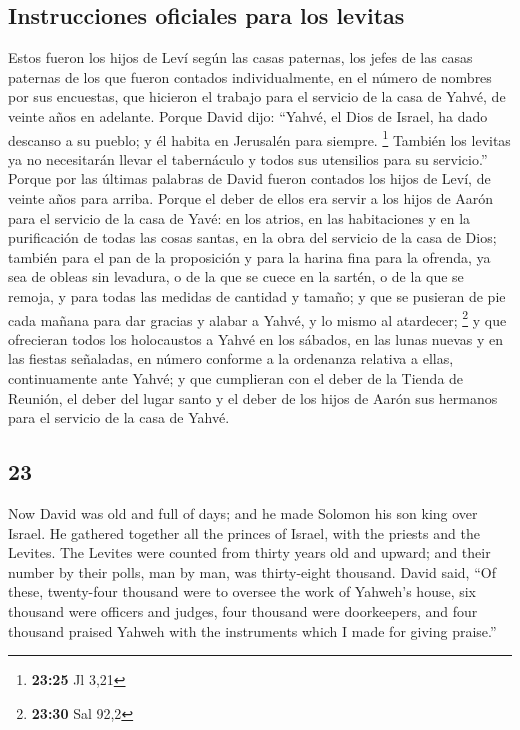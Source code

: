 \begin{paracol}{2}
\hypertarget{instrucciones-oficiales-para-los-levitas}{%
\subsection{Instrucciones oficiales para los
levitas}\label{instrucciones-oficiales-para-los-levitas}}

 Estos fueron los hijos de Leví según las casas paternas,
los jefes de las casas paternas de los que fueron contados
individualmente, en el número de nombres por sus encuestas, que hicieron
el trabajo para el servicio de la casa de Yahvé, de veinte años en
adelante.  Porque David dijo: ``Yahvé, el Dios de Israel,
ha dado descanso a su pueblo; y él habita en Jerusalén para siempre.
\footnote{\textbf{23:25} Jl 3,21}  También los levitas ya
no necesitarán llevar el tabernáculo y todos sus utensilios para su
servicio.''  Porque por las últimas palabras de David
fueron contados los hijos de Leví, de veinte años para arriba.
 Porque el deber de ellos era servir a los hijos de Aarón
para el servicio de la casa de Yavé: en los atrios, en las habitaciones
y en la purificación de todas las cosas santas, en la obra del servicio
de la casa de Dios;  también para el pan de la
proposición y para la harina fina para la ofrenda, ya sea de obleas sin
levadura, o de la que se cuece en la sartén, o de la que se remoja, y
para todas las medidas de cantidad y tamaño;  y que se
pusieran de pie cada mañana para dar gracias y alabar a Yahvé, y lo
mismo al atardecer; \footnote{\textbf{23:30} Sal 92,2}  y
que ofrecieran todos los holocaustos a Yahvé en los sábados, en las
lunas nuevas y en las fiestas señaladas, en número conforme a la
ordenanza relativa a ellas, continuamente ante Yahvé;  y
que cumplieran con el deber de la Tienda de Reunión, el deber del lugar
santo y el deber de los hijos de Aarón sus hermanos para el servicio de
la casa de Yahvé.

\switchcolumn
\begin{otherlanguage}{english}

\hypertarget{section-45}{%
\section{23}\label{section-45}}

 Now David was old and full of days; and he made Solomon
his son king over Israel.  He gathered together all the
princes of Israel, with the priests and the Levites.  The
Levites were counted from thirty years old and upward; and their number
by their polls, man by man, was thirty-eight thousand. 
David said, ``Of these, twenty-four thousand were to oversee the work of
Yahweh's house, six thousand were officers and judges, 
four thousand were doorkeepers, and four thousand praised Yahweh with
the instruments which I made for giving praise.''


\end{otherlanguage}
\end{paracol}
